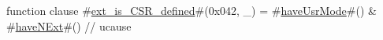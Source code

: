 function clause #\hyperref[sailRISCVzextzyiszyCSRzydefined]{ext\_is\_CSR\_defined}#(0x042, _) = #\hyperref[sailRISCVzhaveUsrMode]{haveUsrMode}#() & #\hyperref[sailRISCVzhaveNExt]{haveNExt}#() // ucause
